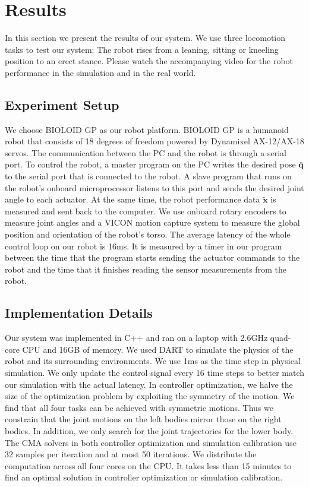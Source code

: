 \section{Results}

In this section we present the results of our system. We use three locomotion tasks to test our system: The robot rises from a leaning, sitting or kneeling position to an erect stance. Please watch the accompanying video for the robot performance in the simulation and in the real world.

\subsection{Experiment Setup}

We choose BIOLOID GP as our robot platform. BIOLOID GP is a humanoid robot that consists of 18 degrees of freedom powered by Dynamixel AX-12/AX-18 servos. The communication between the PC and the robot is through a serial port. To control the robot, a master program on the PC writes the desired pose $\bar{\mathbf{q}}$ to the serial port that is connected to the robot. A slave program that runs on the robot's onboard microprocessor listens to this port and sends the desired joint angle to each actuator. At the same time, the robot performance data $\tilde{\mathbf{x}}$ is measured and sent back to the computer. We use onboard rotary encoders to measure joint angles and a VICON motion capture system to measure the global position and orientation of the robot's torso. The average latency of the whole control loop on our robot is 16ms. It is measured by a timer in our program between the time that the program starts sending the actuator commands to the robot and the time that it finishes reading the sensor measurements from the robot.

\subsection{Implementation Details}

Our system was implemented in C++ and ran on a laptop with 2.6GHz quad-core CPU and 16GB of memory. We used DART to simulate the physics of the robot and its surrounding environments. We use 1ms as the time step in physical simulation. We only update the control signal every 16 time steps to better match our simulation with the actual latency. In controller optimization, we halve the size of the optimization problem by exploiting the symmetry of the motion. We find that all four tasks can be achieved with symmetric motions. Thus we constrain that the joint motions on the left bodies mirror those on the right bodies. In addition, we only search for the joint trajectories for the lower body. The CMA solvers in both controller optimization and simulation calibration use 32 samples per iteration and at most 50 iterations. We distribute the computation across all four cores on the CPU. It takes less than 15 minutes to find an optimal solution in controller optimization or simulation calibration.



